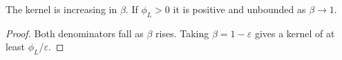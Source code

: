 \begin{theorem}[Discounting]
\label{thm:scc_discount}
\leanok
{}
The kernel is increasing in $\beta$. If $\phi_L > 0$ it is positive and unbounded as $\beta \to 1$.
\end{theorem}
\begin{proof}
\leanok
Both denominators fall as $\beta$ rises. Taking $\beta = 1-\varepsilon$ gives a kernel of at least $\phi_L/\varepsilon$.
\end{proof}
